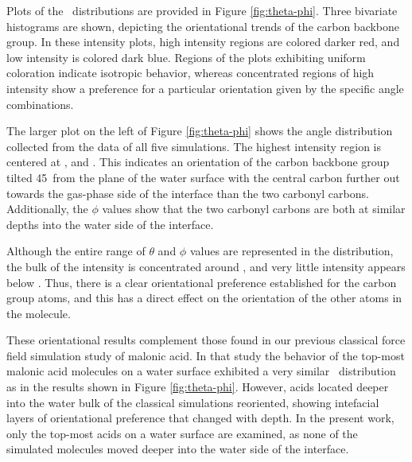 Plots of the \thetaphi~distributions are provided in Figure \ref{fig:theta-phi}. Three bivariate histograms are shown, depicting the orientational trends of the carbon backbone group. In these intensity plots, high intensity regions are colored darker red, and low intensity is colored dark blue. Regions of the plots exhibiting uniform coloration indicate isotropic behavior, whereas concentrated regions of high intensity show a preference for a particular orientation given by the specific angle combinations.

The larger plot on the left of Figure \ref{fig:theta-phi} shows the angle distribution collected from the data of all five simulations. The highest intensity region is centered at \degr, and \degr. This indicates an orientation of the carbon backbone group tilted 45\degr~from the plane of the water surface with the central carbon further out towards the gas-phase side of the interface than the two carbonyl carbons. Additionally, the $\phi$ values show that the two carbonyl carbons are both at similar depths into the water side of the interface.

Although the entire range of $\theta$ and $\phi$ values are represented in the distribution, the bulk of the intensity is concentrated around \degr, and very little intensity appears below \degr. Thus, there is a clear orientational preference established for the carbon group atoms, and this has a direct effect on the orientation of the other atoms in the molecule.

These orientational results complement those found in our previous classical force field simulation study of malonic acid.\cite{Blower2012} In that study the behavior of the top-most malonic acid molecules on a water surface exhibited a very similar \thetaphi~distribution as in the results shown in Figure \ref{fig:theta-phi}. However, acids located deeper into the water bulk of the classical simulations reoriented, showing intefacial layers of orientational preference that changed with depth. In the present work, only the top-most acids on a water surface are examined, as none of the simulated molecules moved deeper into the water side of the interface.


